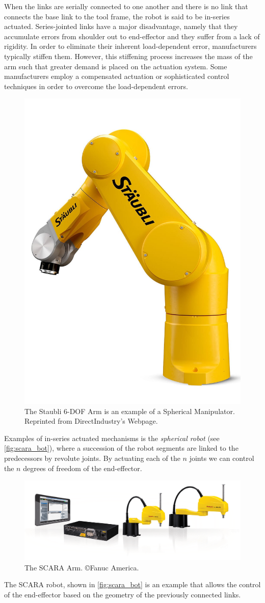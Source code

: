 When the links are serially connected to one another and there is no link that connects the base link to the tool frame, the robot is said to be in-series actuated. Series-jointed links have a major disadvantage, namely that they accumulate errors from shoulder out to end-effector and they suffer from a lack of rigidity. In order to eliminate their inherent load-dependent error, manufacturers typically stiffen them. However, this stiffening process increases the mass of the arm such that greater demand is placed on the actuation system. Some manufacturers employ  a compensated actuation or sophisticated control techniques in order to  overcome the load-dependent errors. 
%
\begin{figure}[t!]
	\centering
	\includegraphics[scale=.1, width=.4\columnwidth]{figures/Staubli.jpg}
	\caption{The Staubli 6-DOF Arm is an example of a Spherical Manipulator. Reprinted from DirectIndustry's Webpage.}
	\label{fig:staubli}
\end{figure}

Examples of in-series actuated mechanisms is the \textit{spherical robot} (see \autoref{fig:scara_bot}), where a succession of the robot segments are linked to the predecessors by revolute joints. By actuating each of the $n$ joints we can control the $n$ degrees of freedom of the end-effector. 
%
\begin{figure}[b!]
	\centering
	\includegraphics[width=\columnwidth]{figures/Scara.png}
	\caption{The SCARA Arm. \copyright Fanuc America.}
	\label{fig:scara_bot}
\end{figure}
%
The SCARA robot, shown in \autoref{fig:scara_bot} is an example that allows the control of the end-effector based on the geometry of the previously connected links. 

